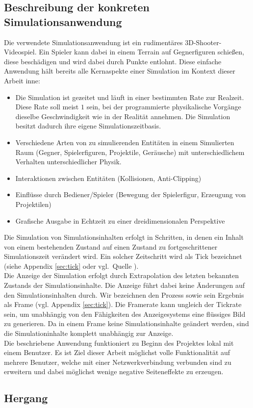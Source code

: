 \subsection{Beschreibung der konkreten Simulationsanwendung}
Die verwendete Simulationsanwendung ist ein rudimentäres 3D-Shooter-Videospiel. Ein Spieler kann dabei in einem Terrain auf Gegnerfiguren schießen, diese beschädigen und wird dabei durch Punkte entlohnt. Diese einfache Anwendung hält bereits alle Kernaspekte einer Simulation im Kontext dieser Arbeit inne:
\begin{itemize}
\item Die Simulation ist gezeitet und läuft in einer bestimmten Rate zur Realzeit. Diese Rate soll meist $1$ sein, bei der programmierte physikalische Vorgänge dieselbe Geschwindigkeit wie in der Realität annehmen. Die Simulation besitzt dadurch ihre eigene Simulationszeitbasis.
\item Verschiedene Arten von zu simulierenden Entitäten in einem Simulierten Raum (Gegner, Spielerfiguren, Projektile, Geräusche) mit unterschiedlichem Verhalten \/unterschiedlicher Physik.
\item Interaktionen zwischen Entitäten (Kollisionen, Anti-Clipping)
\item Einflüsse durch Bediener/Spieler (Bewegung der Spielerfigur, Erzeugung von Projektilen)
\item Grafische Ausgabe in Echtzeit zu einer dreidimensionalen Perspektive
\end{itemize}

Die Simulation von Simulationsinhalten erfolgt in Schritten, in denen ein Inhalt von einem bestehenden Zustand auf einen Zustand zu fortgeschrittener Simulationszeit verändert wird. Ein solcher Zeitschritt wird als Tick bezeichnet (siehe Appendix \ref{sec:tick} oder vgl.~Quelle \cite{tick}).\\
Die Anzeige der Simulation erfolgt durch Extrapolation des letzten bekannten Zustands der Simulationsinhalte. Die Anzeige führt dabei keine Änderungen auf den Simulationsinhalten durch. Wir bezeichnen den Prozess sowie sein Ergebnis als Frame (vgl. Appendix \ref{sec:tick}).
Die Framerate kann ungleich der Tickrate sein, um unabhängig von den Fähigkeiten des Anzeigesystems eine flüssiges Bild zu generieren. Da in einem Frame keine Simulationsinhalte geändert werden, sind die Simulationinhalte komplett unabhängig zur Anzeige.\\

Die beschriebene Anwendung funktioniert zu Beginn des Projektes lokal mit einem Benutzer. Es ist Ziel dieser Arbeit möglichst volle Funktionalität auf mehrere Benutzer, welche mit einer Netzwerkverbindung verbunden sind zu erweitern und dabei möglichst wenige negative Seiteneffekte zu erzeugen.

\subsection{Hergang}
